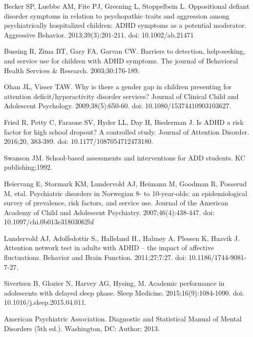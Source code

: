 \documentclass[10pt,letterpaper]{article}
\begin{document}
{\begin{thebibliography}{vancouver.bst}
Becker SP, Luebbe AM, Fite PJ, Greening L,
  Stoppelbein L.
\newblock Oppositional defiant disorder symptoms in relation to psychopathic
  traits and aggression among psychiatrically hospitalized children: {ADHD}
  symptoms as a potential moderator.
\newblock Aggressive Behavior. 2013;39(3):201-211. doi: 10.1002/ab.21471

Bussing R, Zima BT, Gary FA, Garvan CW.
\newblock Barriers to detection, help-seeking, and service use for children
  with {ADHD} symptoms.
\newblock The journal of Behavioral Health Services \& Research. 2003;30:176-189.

Ohan JL, Visser TAW.
\newblock Why is there a gender gap in children presenting for attention
  deficit/hyperactivity disorder services?
\newblock Journal of Clinical Child and Adolescent Psychology. 2009;38(5):650-60. doi: 10.1080/15374410903103627.

 Fried R, Petty C, Faraone SV, Hyder LL, Day H, Biederman J.
\newblock Is ADHD a risk factor for high school dropout? A controlled
study. 
 \newblock Journal of Attention Disorder. 2016;20, 383-389. doi: 10.1177/1087054712473180.
 
Swanson JM.
\newblock School-based assessments and interventions for ADD students. 
\newblock KC publishing;1992.
 
Heiervang E, Stormark KM, Lundervold AJ, Heimann M, Goodman R, Posserud M, etal.  
\newblock Psychiatric disorders in {N}orwegian 8- to 10-year-olds: an
  epidemiological survey of prevalence, risk factors, and service use.
\newblock Journal of the American Academy of Child and Adolescent
  Psychiatry. 2007;46(4):438-447. doi: 10.1097/chi.0b013e31803062bf
  
Lundervold AJ, Adolfsdottir S., Halleland H., Halm\o{}y A, 
  Plessen K, Haavik J.
\newblock Attention network test in adults with ADHD -- the impact of affective
  fluctuations.
\newblock Behavior and Brain Function. 2011;27;7:27.  doi: 10.1186/1744-9081-7-27.

Sivertsen B, Glozier N, Harvey AG, Hysing, M.
\newblock Academic performance in adolescents with delayed sleep phase.
\newblock Sleep Medicine. 2015;16(9):1084-1090. doi: 10.1016/j.sleep.2015.04.011.

American Psychiatric Association. 
\newblock Diagnostic and Statistical Manual of Mental
Disorders (5th ed.). 
\newblock Washington, DC: Author; 2013.


\end{thebibliography}}
\end{document}
